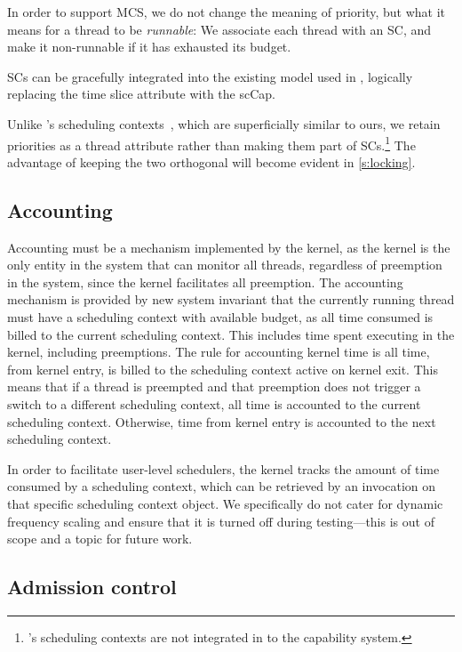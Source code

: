 In order to support MCS, we do not
change the meaning of priority, but what it means for a thread to be
\emph{runnable}: We associate each thread with an SC, and
make it non-runnable if it has exhausted its budget. 


\glspl{SC} can be gracefully integrated into the 
existing model used in \selfour,
logically replacing the time slice attribute with the scCap. 

Unlike \fiascooc's scheduling contexts~\citep{Lackorzynski_WVH_12}, which
are superficially similar to ours, we retain priorities as a thread
attribute rather than making them part of \glspl{SC}.\footnote{\fiascooc's scheduling
contexts are not integrated in to the capability system.} The advantage of keeping the two
orthogonal will become evident in \cref{s:locking}.

\subsection{Accounting}
\label{sec:model-accounting}

Accounting must be a mechanism implemented by the kernel, as the kernel is the only entity in the system
that can monitor all threads, regardless of preemption in the system, since the kernel facilitates all
preemption.
The accounting mechanism is provided by new system invariant that the currently running thread 
must have a scheduling context with available budget, as all time consumed is billed to the
current scheduling context.
This includes time spent executing in the kernel, including preemptions.
The rule for accounting kernel time is all time, from kernel entry, is billed to the scheduling
context active on kernel exit. This means that if a thread is preempted and 
that preemption does not trigger a switch to a 
different scheduling context, all time is accounted to the current scheduling context. Otherwise, 
time from kernel entry is accounted to the next scheduling context.

In order to facilitate user-level schedulers, the kernel tracks the amount of time consumed by a
scheduling context, which can be retrieved by an invocation on that specific scheduling context
object.
We specifically do not cater for dynamic frequency scaling and ensure that it is turned off
during testing---this is out of scope and a topic for future work. 

\subsection{Admission control}
\label{sec:model-admission}


